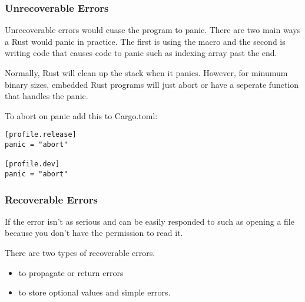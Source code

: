 \documentclass{beamer}
\begin{document}
\begin{frame}
  \frametitle{Unrecoverable Errors}
  Unrecoverable errors would cuase the program to panic. There are two main ways a Rust would panic in practice. The first is using the  macro and the second is writing code that causes code to panic such as indexing array past the end.
  
  Normally, Rust will clean up the stack when it panics. However, for minumum binary sizes, embedded Rust programs will just abort or have a seperate function that handles the panic.

  \pagebreak

  To abort on panic add this to Cargo.toml:

\begin{lstlisting}
[profile.release]
panic = "abort"

[profile.dev]
panic = "abort"
\end{lstlisting}
\end{frame}

\begin{frame}
  \frametitle{Recoverable Errors}
  If the error isn't as serious and can be easily responded to such as opening a file because you don't have the permission to read it.

  There are two types of recoverable errors.
  \begin{itemize}
    \item{ to propagate or return errors}
    \item{ to store optional values and simple errors.}
  \end{itemize}
\end{frame}
\end{document}
